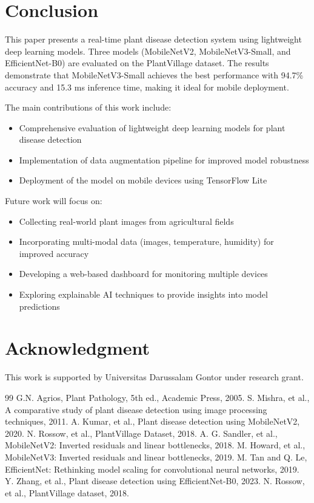 \documentclass[conference]{IEEEtran}
\begin{document}
\section{Conclusion}
This paper presents a real-time plant disease detection system using lightweight deep learning models. Three models (MobileNetV2, MobileNetV3-Small, and EfficientNet-B0) are evaluated on the PlantVillage dataset. The results demonstrate that MobileNetV3-Small achieves the best performance with 94.7\% accuracy and 15.3 ms inference time, making it ideal for mobile deployment.

The main contributions of this work include:
\begin{itemize}
\item Comprehensive evaluation of lightweight deep learning models for plant disease detection
\item Implementation of data augmentation pipeline for improved model robustness
\item Deployment of the model on mobile devices using TensorFlow Lite
\end{itemize}

Future work will focus on:
\begin{itemize}
\item Collecting real-world plant images from agricultural fields
\item Incorporating multi-modal data (images, temperature, humidity) for improved accuracy
\item Developing a web-based dashboard for monitoring multiple devices
\item Exploring explainable AI techniques to provide insights into model predictions
\end{itemize}

\section*{Acknowledgment}
This work is supported by Universitas Darussalam Gontor under research grant.

\begin{thebibliography}{99}
 G.N. Agrios, Plant Pathology, 5th ed., Academic Press, 2005.
 S. Mishra, et al., A comparative study of plant disease detection using image processing techniques, 2011.
 A. Kumar, et al., Plant disease detection using MobileNetV2, 2020.
 N. Rossow, et al., PlantVillage Dataset, 2018.
 A. G. Sandler, et al., MobileNetV2: Inverted residuals and linear bottlenecks, 2018.
 M. Howard, et al., MobileNetV3: Inverted residuals and linear bottlenecks, 2019.
 M. Tan and Q. Le, EfficientNet: Rethinking model scaling for convolutional neural networks, 2019.
 Y. Zhang, et al., Plant disease detection using EfficientNet-B0, 2023.
 N. Rossow, et al., PlantVillage dataset, 2018.
\end{thebibliography}
\end{document}
